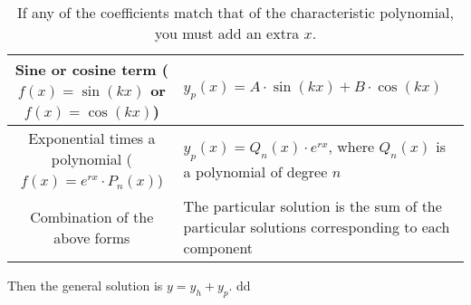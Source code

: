 \documentclass{article}
\begin{document}
{\begin{table}[htbp]
\begin{tabularx}{\textwidth}{|c|X|}
      \hline
      Sine or cosine term ($f(x) = \sin(kx)$ or $f(x) = \cos(kx)$) & $y_p(x) = A \cdot \sin(kx) + B \cdot \cos(kx)$ \\
      \hline
      Exponential times a polynomial ($f(x) = e^{rx} \cdot P_n(x)$) & $y_p(x) = Q_n(x) \cdot e^{rx}$, where $Q_n(x)$ is a polynomial of degree $n$ \\
      \hline
      Combination of the above forms & The particular solution is the sum of the particular solutions corresponding to each component \\
      \hline
    \end{tabularx}
    \caption{If any of the coefficients match that of the characteristic polynomial, you must add an extra $x$.}
    \label{tab:nonhomogeneities}
  \end{table}}
  Then the general solution is $y = y_h + y_p$.\newpage
  dd
\end{document}
